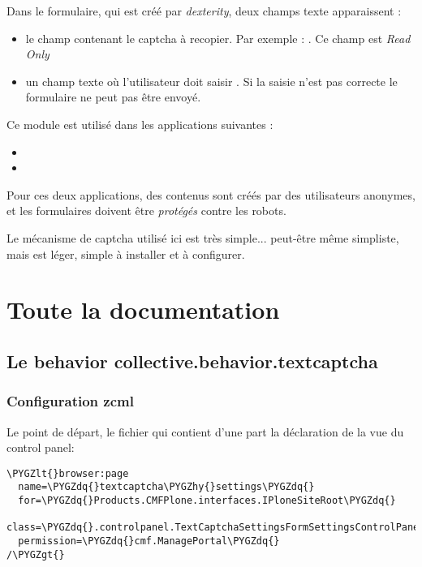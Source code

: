 \documentclass[letterpaper,10pt,french]{sphinxmanual}
\def\PYGZlt{\char`\<}
\def\PYGZgt{\char`\>}
\def\PYGZhy{\char`\-}
\def\PYGZdq{\char`\"}
\begin{document}
Dans le formulaire, qui est créé par \emph{dexterity}, deux champs texte apparaissent :
\begin{itemize}
\item {} 
le champ contenant le captcha à recopier. Par exemple : . Ce champ
est \emph{Read Only}

\item {} 
un champ texte où l'utilisateur doit saisir . Si la saisie n'est
pas correcte le formulaire ne peut pas être envoyé.

\end{itemize}

Ce module est utilisé dans les applications suivantes :
\begin{itemize}
\item {} 

\item {} 

\end{itemize}

Pour ces deux applications, des contenus sont créés par des utilisateurs anonymes,
et les formulaires doivent être \emph{protégés} contre les robots.

Le mécanisme de captcha utilisé ici est très simple... peut-être même simpliste,
mais est léger, simple à installer et à configurer.


\chapter{Toute la documentation}
\label{index:toute-la-documentation}

\section{Le behavior collective.behavior.textcaptcha}
\label{behavior:le-behavior-collective-behavior-textcaptcha}\label{behavior::doc}

\subsection{Configuration zcml}
\label{behavior:configuration-zcml}
Le point de départ, le fichier  qui contient d'une part la
déclaration de la vue du control panel:

\begin{Verbatim}[commandchars=\\\{\}]
\PYGZlt{}browser:page
  name=\PYGZdq{}textcaptcha\PYGZhy{}settings\PYGZdq{}
  for=\PYGZdq{}Products.CMFPlone.interfaces.IPloneSiteRoot\PYGZdq{}
  class=\PYGZdq{}.controlpanel.TextCaptchaSettingsFormSettingsControlPanel\PYGZdq{}
  permission=\PYGZdq{}cmf.ManagePortal\PYGZdq{}
/\PYGZgt{}
\end{Verbatim}
\end{document}
